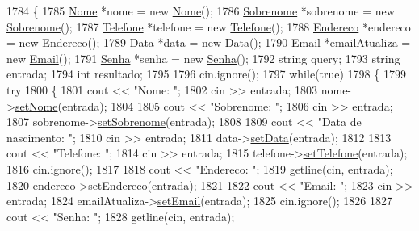 \begin{DoxyCode}
1784 \{
1785   \mbox{\hyperlink{class_nome}{Nome}} *nome = \textcolor{keyword}{new} \mbox{\hyperlink{class_nome}{Nome}}();
1786   \mbox{\hyperlink{class_sobrenome}{Sobrenome}} *sobrenome = \textcolor{keyword}{new} \mbox{\hyperlink{class_sobrenome}{Sobrenome}}();
1787   \mbox{\hyperlink{class_telefone}{Telefone}} *telefone = \textcolor{keyword}{new} \mbox{\hyperlink{class_telefone}{Telefone}}();
1788   \mbox{\hyperlink{class_endereco}{Endereco}} *endereco = \textcolor{keyword}{new} \mbox{\hyperlink{class_endereco}{Endereco}}();
1789   \mbox{\hyperlink{class_data}{Data}} *data = \textcolor{keyword}{new} \mbox{\hyperlink{class_data}{Data}}();
1790   \mbox{\hyperlink{class_email}{Email}} *emailAtualiza = \textcolor{keyword}{new} \mbox{\hyperlink{class_email}{Email}}();
1791   \mbox{\hyperlink{class_senha}{Senha}} *senha = \textcolor{keyword}{new} \mbox{\hyperlink{class_senha}{Senha}}();
1792   \textcolor{keywordtype}{string} query;
1793   \textcolor{keywordtype}{string} entrada;
1794   \textcolor{keywordtype}{int} resultado;
1795 
1796   cin.ignore();
1797   \textcolor{keywordflow}{while}(\textcolor{keyword}{true})
1798   \{
1799     \textcolor{keywordflow}{try}
1800     \{
1801       cout << \textcolor{stringliteral}{"Nome: "};
1802       cin >> entrada;
1803       nome->\mbox{\hyperlink{class_nome_a83b9f56ec9f86f4b976846f4c5c65b30}{setNome}}(entrada);
1804 
1805       cout << \textcolor{stringliteral}{"Sobrenome: "};
1806       cin >> entrada;
1807       sobrenome->\mbox{\hyperlink{class_sobrenome_a9dc2277e3600656838e47c86dfddd23a}{setSobrenome}}(entrada);
1808 
1809       cout << \textcolor{stringliteral}{"Data de nascimento: "};
1810       cin >> entrada;
1811       data->\mbox{\hyperlink{class_data_a5245638838a033c98a8b760836dddb7d}{setData}}(entrada);
1812 
1813       cout << \textcolor{stringliteral}{"Telefone: "};
1814       cin >> entrada;
1815       telefone->\mbox{\hyperlink{class_telefone_ad85910fc35320e4a8e7ede8d40bbc454}{setTelefone}}(entrada);
1816       cin.ignore();
1817 
1818       cout << \textcolor{stringliteral}{"Endereco: "};
1819       getline(cin, entrada);
1820       endereco->\mbox{\hyperlink{class_endereco_a36e8c19c5e97f321d77aece5b3e53239}{setEndereco}}(entrada);
1821 
1822       cout << \textcolor{stringliteral}{"Email: "};
1823       cin >> entrada;
1824       emailAtualiza->\mbox{\hyperlink{class_email_a2614b3a19d961411d1bece9c1bdf616f}{setEmail}}(entrada);
1825       cin.ignore();
1826 
1827       cout << \textcolor{stringliteral}{"Senha: "};
1828       getline(cin, entrada);

\end{DoxyCode}

